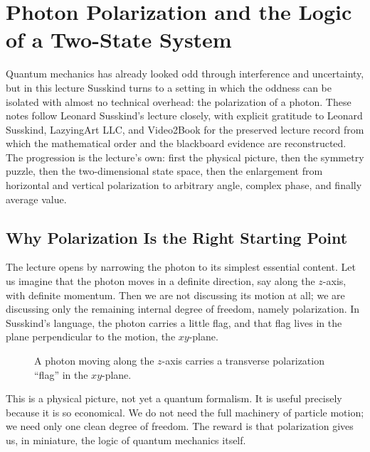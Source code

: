 \chapter{Photon Polarization and the Logic of a Two-State System}

Quantum mechanics has already looked odd through interference and uncertainty, but in this lecture Susskind turns to a setting in which the oddness can be isolated with almost no technical overhead: the polarization of a photon. These notes follow Leonard Susskind's lecture closely, with explicit gratitude to Leonard Susskind, LazyingArt LLC, and Video2Book for the preserved lecture record from which the mathematical order and the blackboard evidence are reconstructed. The progression is the lecture's own: first the physical picture, then the symmetry puzzle, then the two-dimensional state space, then the enlargement from horizontal and vertical polarization to arbitrary angle, complex phase, and finally average value.

\section{Why Polarization Is the Right Starting Point}

The lecture opens by narrowing the photon to its simplest essential content. Let us imagine that the photon moves in a definite direction, say along the \(z\)-axis, with definite momentum. Then we are not discussing its motion at all; we are discussing only the remaining internal degree of freedom, namely polarization. In Susskind's language, the photon carries a little flag, and that flag lives in the plane perpendicular to the motion, the \(xy\)-plane.

\begin{figure}
\centering
{}
\caption{A photon moving along the \(z\)-axis carries a transverse polarization ``flag'' in the \(xy\)-plane.}
\end{figure}

This is a physical picture, not yet a quantum formalism. It is useful precisely because it is so economical. We do not need the full machinery of particle motion; we need only one clean degree of freedom. The reward is that polarization gives us, in miniature, the logic of quantum mechanics itself.

